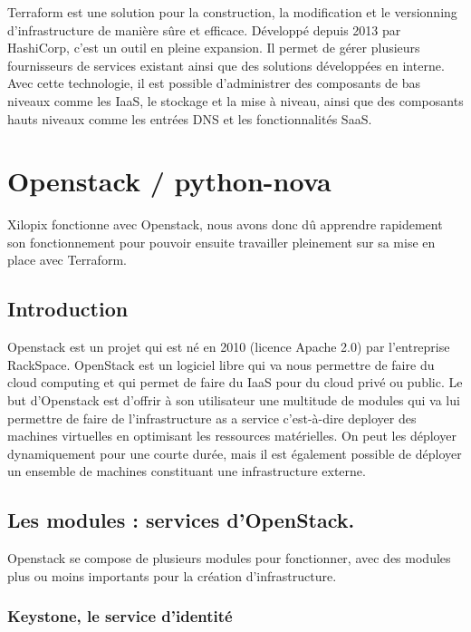 \documentclass[]{article}
\begin{document}
Terraform est une solution pour la construction, la modification et le
versionning d'infrastructure de manière sûre et efficace. Développé
depuis 2013 par HashiCorp, c'est un outil en pleine expansion. Il permet
de gérer plusieurs fournisseurs de services existant ainsi que des
solutions développées en interne. Avec cette technologie, il est
possible d'administrer des composants de bas niveaux comme les IaaS, le
stockage et la mise à niveau, ainsi que des composants hauts niveaux
comme les entrées DNS et les fonctionnalités SaaS.

\newpage
\section{Openstack / python-nova}\label{openstack-python-nova}

Xilopix fonctionne avec Openstack, nous avons donc dû apprendre
rapidement son fonctionnement pour pouvoir ensuite travailler pleinement
sur sa mise en place avec Terraform.

\subsection{Introduction}\label{introduction-1}

Openstack est un projet qui est né en 2010 (licence Apache 2.0) par
l'entreprise RackSpace. OpenStack est un logiciel libre qui va nous
permettre de faire du cloud computing et qui permet de faire du IaaS
pour du cloud privé ou public. Le but d'Openstack est d'offrir à son
utilisateur une multitude de modules qui va lui permettre de faire de
l'infrastructure as a service c'est-à-dire deployer des machines
virtuelles en optimisant les ressources matérielles. On peut les
déployer dynamiquement pour une courte durée, mais il est également
possible de déployer un ensemble de machines constituant une
infrastructure externe.

\subsection{Les modules : services
d'OpenStack.}\label{les-modules-services-dopenstack.}

Openstack se compose de plusieurs modules pour fonctionner, avec des
modules plus ou moins importants pour la création d'infrastructure.

\subsubsection{Keystone, le service
d'identité}\label{keystone-le-service-didentituxe9}
\end{document}
